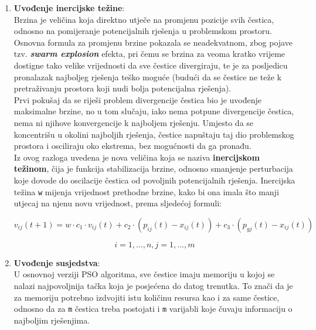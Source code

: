 \documentclass[12pt, a4paper]{article}
\begin{document}
\begin{enumerate}

\item \textbf{Uvođenje inercijske težine}: \\

Brzina je veličina koja direktno utječe na promjenu pozicije svih čestica, odnosno na pomijeranje potencijalnih rješenja u problemskom prostoru. Osnovna formula za promjenu brzine pokazala se neadekvatnom, zbog pojave tzv. \textbf{\textit{swarm explosion}} efekta, pri čemu se brzina za veoma kratko vrijeme dostigne tako velike vrijednosti da sve čestice divergiraju, te je za posljedicu pronalazak najboljeg rješenja teško moguće (budući da se čestice ne teže k pretraživanju prostora koji nudi bolja potencijalna rješenja). \\

Prvi pokušaj da se riješi problem divergencije čestica bio je uvođenje maksimalne brzine, no u tom slučaju, iako nema potpune divergencije čestica, nema ni njihove konvergencije k najboljem rješenju. Umjesto da se koncentrišu u okolini najboljih rješenja, čestice napuštaju taj dio problemskog prostora i osciliraju oko ekstrema, bez mogućnosti da ga pronađu. \cite{pso} \\ 

Iz ovog razloga uvedena je nova veličina koja se naziva \textbf{inercijskom težinom}, čija je funkcija stabilizacija brzine, odnosno smanjenje perturbacija koje dovode do oscilacije čestica od povoljnih potencijalnih rješenja. Inercijska težina \texttt{w} mijenja vrijednost prethodne brzine, kako bi ona imala što manji utjecaj na njenu novu vrijednost, prema sljedećoj formuli: \cite{pso}

\begin{equation}
v_{ij}(t + 1) = w \cdot c_1 \cdot v_{ij}(t) + c_2 \cdot (p_{ij}(t) - x_{ij}(t)) + c_3 \cdot (p_{gj}(t) - x_{ij}(t))
\end{equation}

\begin{equation*}
i = 1, ..., n, j = 1, ..., m
\end{equation*}

\item \textbf{Uvođenje susjedstva}: \\

U osnovnoj verziji PSO algoritma, sve čestice imaju memoriju u kojoj se nalazi najpovoljnija tačka koja je posjećena do datog trenutka. To znači da je za memoriju potrebno izdvojiti istu količinu resursa kao i za same čestice, odnosno da za \texttt{m} čestica treba postojati i \texttt{m} varijabli koje čuvaju informaciju o najboljim rješenjima. \\


\end{enumerate}
\end{document}
